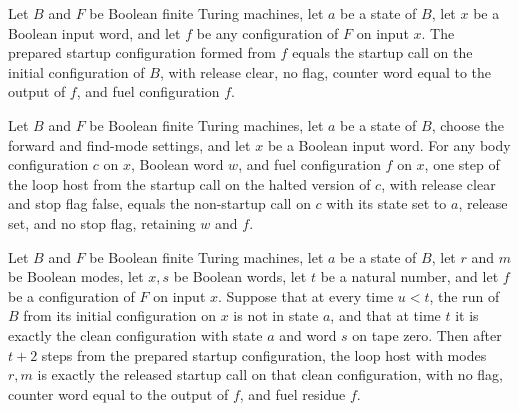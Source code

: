 \begin{lemma}
\label{Turing.FinTM.loopReady_call}
\leanok
{}
Let $B$ and $F$ be Boolean finite Turing machines, let $a$ be a state of $B$, let $x$ be
a Boolean input word, and let $f$ be any configuration of $F$ on input $x$. The prepared
startup configuration formed from $f$ equals the startup call on the initial
configuration of $B$, with release clear, no flag, counter word equal to the output of
$f$, and fuel configuration $f$.
\end{lemma}

\begin{lemma}
\label{Turing.FinTM.loopHost_release}
\leanok
{}
Let $B$ and $F$ be Boolean finite Turing machines, let $a$ be a state of $B$, choose the
forward and find-mode settings, and let $x$ be a Boolean input word. For any body
configuration $c$ on $x$, Boolean word $w$, and fuel configuration $f$ on $x$, one step
of the loop host from the startup call on the halted version of $c$, with release clear
and stop flag false, equals the non-startup call on $c$ with its state set to $a$,
release set, and no stop flag, retaining $w$ and $f$.
\end{lemma}

\begin{lemma}
\label{Turing.FinTM.loopHost_start}
\leanok
{}
Let $B$ and $F$ be Boolean finite Turing machines, let $a$ be a state of $B$, let $r$
and $m$ be Boolean modes, let $x,s$ be Boolean words, let $t$ be a natural number, and
let $f$ be a configuration of $F$ on input $x$. Suppose that at every time $u<t$, the
run of $B$ from its initial configuration on $x$ is not in state $a$, and that at time
$t$ it is exactly the clean configuration with state $a$ and word $s$ on tape zero. Then
after $t+2$ steps from the prepared startup configuration, the loop host with modes
$r,m$ is exactly the released startup call on that clean configuration, with no flag,
counter word equal to the output of $f$, and fuel residue $f$.
\end{lemma}

